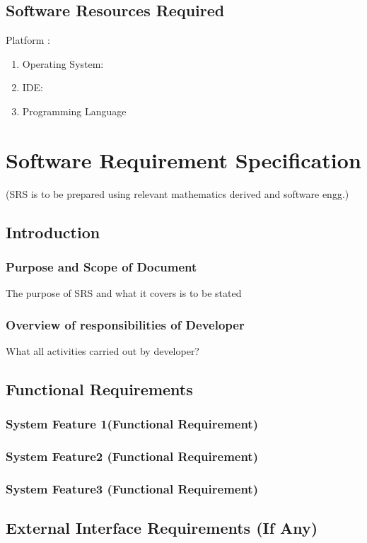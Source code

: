 \documentclass[oneside,a4paper,12pt]{report}
\begin{document}
\section{Software Resources Required}
Platform : 
\begin{enumerate}
\item Operating System: 
\item IDE: 
\item Programming Language
\end{enumerate}

\chapter{Software Requirement Specification  }
(SRS is to be prepared using relevant mathematics derived and software engg.)
\section{Introduction}
\subsection{Purpose and Scope of Document}
The purpose of SRS and what it covers is to be stated 

\subsection{Overview of responsibilities of Developer}
What all activities carried out by developer?
  
\section{Functional Requirements}
  
 \subsection{System Feature 1(Functional Requirement)}  

\subsection{System Feature2 (Functional Requirement)}
\subsection{System Feature3 (Functional Requirement)}


\section{External Interface Requirements (If Any)}
\end{document}
